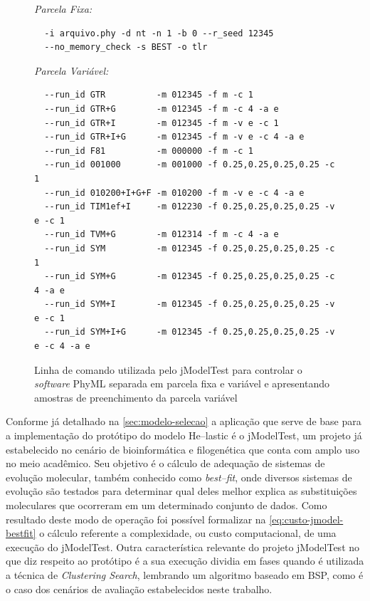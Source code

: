 \documentclass[english,brazilian]{UNISINOSmonografia} %
\begin{document}
\begin{figure}[tb]
	\centering%
	\begin{minipage}{\textwidth}
		\caption{Linha de comando utilizada pelo jModelTest para controlar o \textit{software} PhyML separada em parcela fixa e variável e apresentando amostras de preenchimento da parcela variável}
		\label{fig:prototipo-phyml-cmdline}
		\vspace{1ex}
		\begin{footnotesize}
			\textsf{\emph{Parcela Fixa:}}
			\begin{verbatim}
  -i arquivo.phy -d nt -n 1 -b 0 --r_seed 12345
  --no_memory_check -s BEST -o tlr
			\end{verbatim}
			\textsf{\emph{Parcela Variável:}}
			\begin{verbatim}
  --run_id GTR          -m 012345 -f m -c 1
  --run_id GTR+G        -m 012345 -f m -c 4 -a e
  --run_id GTR+I        -m 012345 -f m -v e -c 1
  --run_id GTR+I+G      -m 012345 -f m -v e -c 4 -a e
  --run_id F81          -m 000000 -f m -c 1 
  --run_id 001000       -m 001000 -f 0.25,0.25,0.25,0.25 -c 1
  --run_id 010200+I+G+F -m 010200 -f m -v e -c 4 -a e
  --run_id TIM1ef+I     -m 012230 -f 0.25,0.25,0.25,0.25 -v e -c 1
  --run_id TVM+G        -m 012314 -f m -c 4 -a e
  --run_id SYM          -m 012345 -f 0.25,0.25,0.25,0.25 -c 1
  --run_id SYM+G        -m 012345 -f 0.25,0.25,0.25,0.25 -c 4 -a e
  --run_id SYM+I        -m 012345 -f 0.25,0.25,0.25,0.25 -v e -c 1
  --run_id SYM+I+G      -m 012345 -f 0.25,0.25,0.25,0.25 -v e -c 4 -a e
			\end{verbatim}
		\end{footnotesize}
	\end{minipage}
\end{figure}


Conforme já detalhado na \autoref{sec:modelo-selecao} a aplicação que serve de base para a implementação do protótipo do modelo \textsf{He}--lastic é o jModelTest, um projeto já estabelecido no cenário de bioinformática e filogenética que conta com amplo uso no meio acadêmico.
Seu objetivo é o cálculo de adequação de sistemas de evolução molecular, também conhecido como \textit{best--fit}, onde diversos sistemas de evolução são testados para determinar qual deles melhor explica as substituições moleculares que ocorreram em um determinado conjunto de dados.
Como resultado deste modo de operação foi possível formalizar na \autoref{eq:custo-jmodel-bestfit} o cálculo referente a complexidade, ou custo computacional, de uma execução do jModelTest.
Outra característica relevante do projeto jModelTest no que diz respeito ao protótipo é a sua execução dividia em fases quando é utilizada a técnica de \textit{Clustering Search}, lembrando um algoritmo baseado em BSP, como é o caso dos cenários de avaliação estabelecidos neste trabalho.
\end{document}

